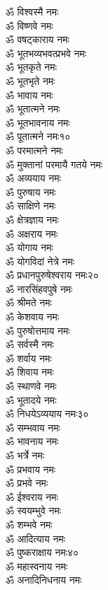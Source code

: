 \begin{multicols}{2}\setlength{\columnseprule}{1pt}
\begin{flushleft}
ॐ विश्वस्मै नमः\\
ॐ विष्णवे नमः\\
ॐ वषट्काराय नमः\\
ॐ भूतभव्यभवत्प्रभवे नमः\\
ॐ भूतकृते नमः\\
ॐ भूतभृते नमः\\
ॐ भावाय नमः\\
ॐ भूतात्मने नमः\\
ॐ भूतभावनाय नमः\\
ॐ पूतात्मने नमः\hfill १०\\
ॐ परमात्मने नमः\\
ॐ मुक्तानां परमायै गतये नमः\\
ॐ अव्ययाय नमः\\
ॐ पुरुषाय नमः\\
ॐ साक्षिणे नमः\\
ॐ क्षेत्रज्ञाय नमः\\
ॐ अक्षराय नमः\\
ॐ योगाय नमः\\
ॐ योगविदां नेत्रे नमः\\
ॐ प्रधानपुरुषेश्वराय नमः\hfill २०\\
ॐ नारसिंहवपुषे नमः\\
ॐ श्रीमते नमः\\
ॐ केशवाय नमः\\
ॐ पुरुषोत्तमाय नमः\\
ॐ सर्वस्मै नमः\\
ॐ शर्वाय नमः\\
ॐ शिवाय नमः\\
ॐ स्थाणवे नमः\\
ॐ भूतादये नमः\\
ॐ निधयेऽव्ययाय नमः\hfill ३०\\
ॐ सम्भवाय नमः\\
ॐ भावनाय नमः\\
ॐ भर्त्रे नमः\\
ॐ प्रभवाय नमः\\
ॐ प्रभवे नमः\\
ॐ ईश्वराय नमः\\
ॐ स्वयम्भुवे नमः\\
ॐ शम्भवे नमः\\
ॐ आदित्याय नमः\\
ॐ पुष्कराक्षाय नमः\hfill ४०\\
ॐ महास्वनाय नमः\\
ॐ अनादिनिधनाय नमः\\

\end{flushleft}
\end{multicols}
